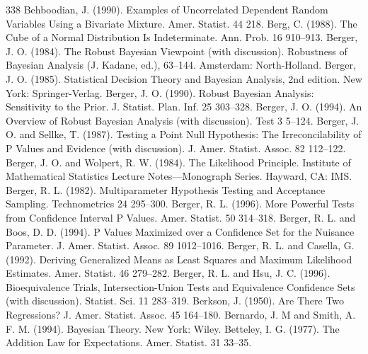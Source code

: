 \begin{thebibliography}{338}
\label{bib:source15} Behboodian, J. (1990). Examples of Uncorrelated Dependent Random Variables Using a Bivariate Mixture. Amer. Statist. 44 218.
\label{bib:source16} Berg, C. (1988). The Cube of a Normal Distribution Is Indeterminate. Ann. Prob. 16 910–913.
\label{bib:source17} Berger, J. O. (1984). The Robust Bayesian Viewpoint (with discussion). Robustness of Bayesian Analysis (J. Kadane, ed.), 63–144. Amsterdam: North-Holland.
\label{bib:source18} Berger, J. O. (1985). Statistical Decision Theory and Bayesian Analysis, 2nd edition. New York: Springer-Verlag.
\label{bib:source19} Berger, J. O. (1990). Robust Bayesian Analysis: Sensitivity to the Prior. J. Statist. Plan. Inf. 25 303–328.
\label{bib:source20} Berger, J. O. (1994). An Overview of Robust Bayesian Analysis (with discussion). Test 3 5–124.
\label{bib:source21} Berger, J. O. and Sellke, T. (1987). Testing a Point Null Hypothesis: The Irreconcilability of P Values and Evidence (with discussion). J. Amer. Statist. Assoc. 82 112–122.
\label{bib:source22} Berger, J. O. and Wolpert, R. W. (1984). The Likelihood Principle. Institute of Mathematical Statistics Lecture Notes—Monograph Series. Hayward, CA: IMS.
\label{bib:source23} Berger, R. L. (1982). Multiparameter Hypothesis Testing and Acceptance Sampling. Technometrics 24 295–300.
\label{bib:source24} Berger, R. L. (1996). More Powerful Tests from Confidence Interval P Values. Amer. Statist. 50 314–318.
\label{bib:source25} Berger, R. L. and Boos, D. D. (1994). P Values Maximized over a Confidence Set for the Nuisance Parameter. J. Amer. Statist. Assoc. 89 1012–1016.
\label{bib:source26} Berger, R. L. and Casella, G. (1992). Deriving Generalized Means as Least Squares and Maximum Likelihood Estimates. Amer. Statist. 46 279–282.
\label{bib:source27} Berger, R. L. and Hsu, J. C. (1996). Bioequivalence Trials, Intersection-Union Tests and Equivalence Confidence Sets (with discussion). Statist. Sci. 11 283–319.
\label{bib:source28} Berkson, J. (1950). Are There Two Regressions? J. Amer. Statist. Assoc. 45 164–180.
\label{bib:source29} Bernardo, J. M and Smith, A. F. M. (1994). Bayesian Theory. New York: Wiley.
\label{bib:source30} Betteley, I. G. (1977). The Addition Law for Expectations. Amer. Statist. 31 33–35.

\end{thebibliography}
